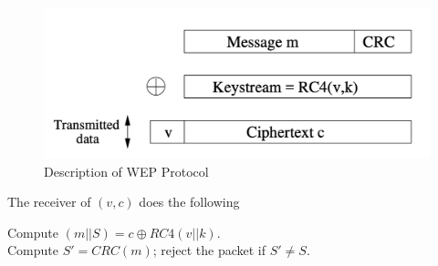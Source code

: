 \documentclass[12pt,titlepage]{article}
\begin{document}
\begin{center}
	\begin{figure}[h!]
		\includegraphics[width=\textwidth]{WEP_Protocol.png}
		\caption{Description of WEP Protocol}
	\end{figure}
\end{center}

\begin{algorithm}
	\caption{The receiver of $(v, c)$ does the following}
	Compute $(m || S) = c \oplus RC4(v || k)$.\\
	Compute $S' = CRC(m)$; reject the packet if $S' \neq S$.
\end{algorithm}
\end{document}
